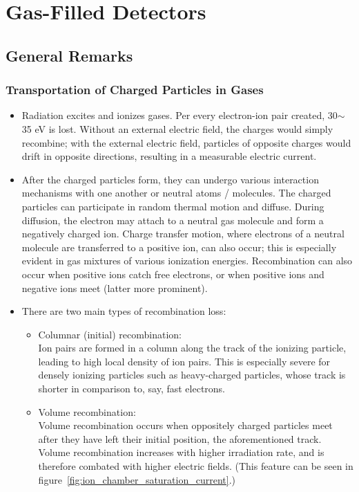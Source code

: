 \section{Gas-Filled Detectors} 
\subsection{General Remarks}
\subsubsection{Transportation of Charged Particles in Gases}
\begin{itemize}
    \item Radiation excites and ionizes gases. Per every electron-ion pair created, 30$\sim$35 eV is lost. Without an external electric field, the charges would simply recombine; with the external electric field, particles of opposite charges would drift in opposite directions, resulting in a measurable electric current. 
    \item After the charged particles form, they can undergo various interaction mechanisms with one another or neutral atoms / molecules. The charged particles can participate in random thermal motion and diffuse. During diffusion, the electron may attach to a neutral gas molecule and form a negatively charged ion. Charge transfer motion, where electrons of a neutral molecule are transferred to a positive ion, can also occur; this is especially evident in gas mixtures of various ionization energies. Recombination can also occur when positive ions catch free electrons, or when positive ions and negative ions meet (latter more prominent). 
    \item There are two main types of recombination loss:
    \begin{itemize}
        \item Columnar (initial) recombination:\\
        Ion pairs are formed in a column along the track of the ionizing particle, leading to high local density of ion pairs. This is especially severe for densely ionizing particles such as heavy-charged particles, whose track is shorter in comparison to, say, fast electrons. 
        \item Volume recombination:\\
        Volume recombination occurs when oppositely charged particles meet after they have left their initial position, the aforementioned track. Volume recombination increases with higher irradiation rate, and is therefore combated with higher electric fields. (This feature can be seen in figure~\ref{fig:ion_chamber_saturation_current}.)

\end{itemize}
\end{itemize}

